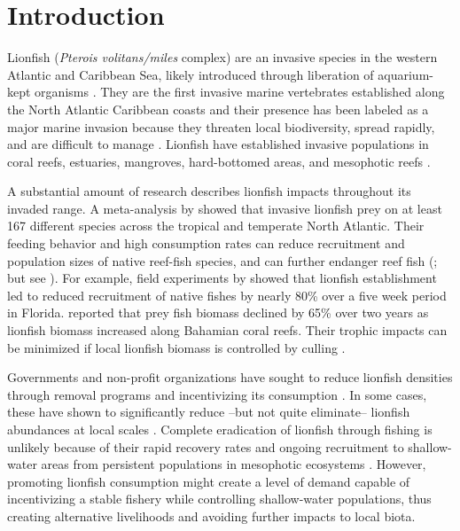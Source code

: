 \documentclass[smallextended]{svjour3}       %
\begin{document}
\def\spacingset#1{\renewcommand{\baselinestretch}%
{#1}\small\normalsize} \spacingset{1}


\section{Introduction}\label{introduction}

Lionfish (\emph{Pterois volitans/miles} complex) are an invasive species
in the western Atlantic and Caribbean Sea, likely introduced through
liberation of aquarium-kept organisms \citep{betancurr_2011}. They are
the first invasive marine vertebrates established along the North
Atlantic Caribbean coasts
\citep{schofield_2009,schofield_2010,sabidoitza_2016} and their presence
has been labeled as a major marine invasion because they threaten local
biodiversity, spread rapidly, and are difficult to manage
\citep{hixon_2016}. Lionfish have established invasive populations in
coral reefs, estuaries, mangroves, hard-bottomed areas, and mesophotic
reefs
\citep{barbour_2010,jud_2011,muoz_2011,claydon_2012,andradibrown_2017,gress_2017}.

A substantial amount of research describes lionfish impacts throughout
its invaded range. A meta-analysis by \citet{peake_2018} showed that
invasive lionfish prey on at least 167 different species across the
tropical and temperate North Atlantic. Their feeding behavior and high
consumption rates can reduce recruitment and population sizes of native
reef-fish species, and can further endanger reef fish
(\citet{green_2012,rocha_2015}; but see \citet{hackerott_2017}). For
example, field experiments by \citet{albins_2008} showed that lionfish
establishment led to reduced recruitment of native fishes by nearly 80\%
over a five week period in Florida. \citet{green_2012} reported that
prey fish biomass declined by 65\% over two years as lionfish biomass
increased along Bahamian coral reefs. Their trophic impacts can be
minimized if local lionfish biomass is controlled by culling
\citep{ariasgonzalez_2011}.

Governments and non-profit organizations have sought to reduce lionfish
densities through removal programs and incentivizing its consumption
\citep{chin_2016}. In some cases, these have shown to significantly
reduce --but not quite eliminate-- lionfish abundances at local scales
\citep{deleon_2013,sandel_2015}. Complete eradication of lionfish
through fishing is unlikely because of their rapid recovery rates and
ongoing recruitment to shallow-water areas from persistent populations
in mesophotic ecosystems \citep{barbour_2011,andradibrown_2017}.
However, promoting lionfish consumption might create a level of demand
capable of incentivizing a stable fishery while controlling
shallow-water populations, thus creating alternative livelihoods and
avoiding further impacts to local biota.
\end{document}
